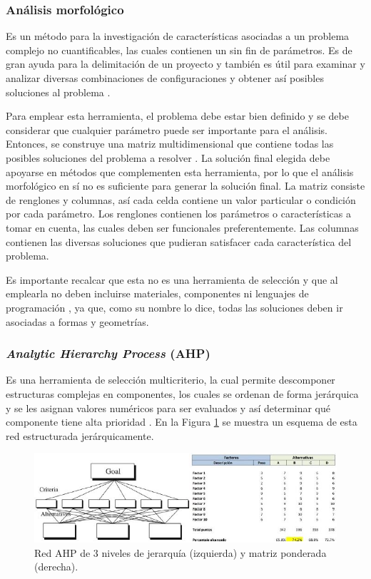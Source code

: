 \subsubsection{Análisis morfológico}
Es un método para la investigación de características asociadas a un problema complejo no cuantificables, las cuales contienen un sin fin de parámetros. Es de gran ayuda para la delimitación de un proyecto y también es útil para examinar y analizar diversas combinaciones de configuraciones y obtener así posibles soluciones al problema \cite{M16}.

Para emplear esta herramienta, el problema debe estar bien definido y se debe considerar que cualquier parámetro puede ser importante para el análisis. Entonces, se construye una matriz multidimensional que contiene todas las posibles soluciones del problema a resolver \cite{M16}. La solución final elegida debe apoyarse en métodos que complementen esta herramienta, por lo que el análisis morfológico en sí no es suficiente para generar la solución final.
La matriz consiste de renglones y columnas, así cada celda contiene un valor particular o condición por cada parámetro. Los renglones contienen los parámetros o características a tomar en cuenta, las cuales deben ser funcionales preferentemente. Las columnas contienen las diversas soluciones que pudieran satisfacer cada característica del problema.

Es importante recalcar que esta no es una herramienta de selección y que al emplearla no deben incluirse materiales, componentes ni lenguajes de programación \cite{M17}, ya que, como su nombre lo dice, todas las soluciones deben ir asociadas a formas y geometrías.

\subsubsection{\textit{Analytic Hierarchy Process} (AHP)}
Es una herramienta de selección multicriterio, la cual permite descomponer estructuras complejas en componentes, los cuales se ordenan de forma jerárquica y se les asignan valores numéricos para ser evaluados y así determinar qué componente tiene alta prioridad \cite{I17}. En la Figura \ref{fig:AHP1} se muestra un esquema de esta red estructurada jerárquicamente.\\

\begin{figure}[H]
	\centering
	\includegraphics[width=\columnwidth]{imagenes/RedAHP}
	\caption{Red AHP de 3 niveles de jerarquía (izquierda) \cite{I17} y matriz ponderada (derecha).}
	\label{fig:AHP1}
\end{figure}


